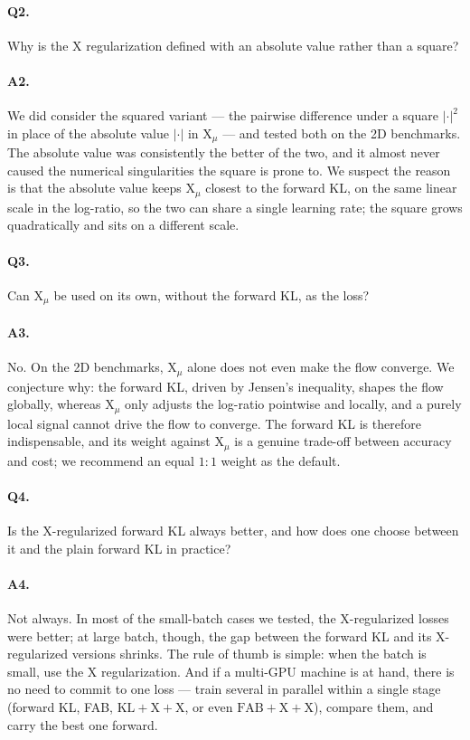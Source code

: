\documentclass{article}
\newcommand{\KL}{\mathrm{KL}}
\newcommand{\X}{\mathrm{X}}
\begin{document}
\paragraph{Q2.} Why is the X regularization defined with an absolute value
rather than a square?

\paragraph{A2.} We did consider the squared variant --- the pairwise difference
under a square $|\cdot|^2$ in place of the absolute value $|\cdot|$ in $\X_\mu$
--- and tested both on the 2D benchmarks. The absolute value was consistently
the better of the two, and it almost never caused the numerical singularities
the square is prone to. We suspect the reason is that the absolute value keeps
$\X_\mu$ closest to the forward KL, on the same linear scale in the log-ratio,
so the two can share a single learning rate; the square grows quadratically and
sits on a different scale.

\paragraph{Q3.} Can $\X_\mu$ be used on its own, without the forward KL, as the
loss?

\paragraph{A3.} No. On the 2D benchmarks, $\X_\mu$ alone does not even make the
flow converge. We conjecture why: the forward KL, driven by Jensen's inequality,
shapes the flow globally, whereas $\X_\mu$ only adjusts the log-ratio pointwise
and locally, and a purely local signal cannot drive the flow to converge. The
forward KL is therefore indispensable, and its weight against $\X_\mu$ is a
genuine trade-off between accuracy and cost; we recommend an equal $1{:}1$
weight as the default.

\paragraph{Q4.} Is the X-regularized forward KL always better, and how does one
choose between it and the plain forward KL in practice?

\paragraph{A4.} Not always. In most of the small-batch cases we tested, the
X-regularized losses were better; at large batch, though, the gap between the
forward KL and its X-regularized versions shrinks. The rule of thumb is simple:
when the batch is small, use the X regularization. And if a multi-GPU machine is
at hand, there is no need to commit to one loss --- train several in parallel
within a single stage (forward KL, FAB, $\KL{+}\X{+}\X$, or even
$\mathrm{FAB}{+}\X{+}\X$), compare them, and carry the best one forward.
\end{document}
